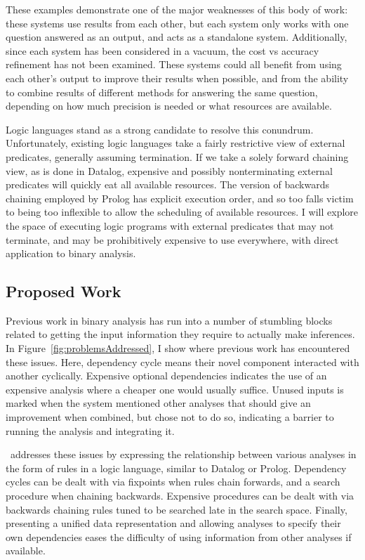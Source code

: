 These examples demonstrate one of the major weaknesses of this body of work: these systems use results from each other, but each system only works with one question answered as an output, and acts as a standalone system.
Additionally, since each system has been considered in a vacuum, the cost vs accuracy refinement has not been examined.
These systems could all benefit from using each other's output to improve their results when possible, and from the ability to combine results of different methods for answering the same question, depending on how much precision is needed or what resources are available.

Logic languages stand as a strong candidate to resolve this conundrum. Unfortunately, existing logic languages take a fairly restrictive view of external predicates, generally assuming termination.
If we take a solely forward chaining view, as is done in Datalog, expensive and possibly nonterminating external predicates will quickly eat all available resources.
The version of backwards chaining employed by Prolog has explicit execution order, and so too falls victim to being too inflexible to allow the scheduling of available resources.
I will explore the space of executing logic programs with external predicates that may not terminate, and may be prohibitively expensive to use everywhere, with direct application to binary analysis.

\subsection{Proposed Work}
Previous work in binary analysis has run into a number of stumbling blocks related to getting the input information they require to actually make inferences. 
In Figure~\ref{fig:problemsAddressed}, I show where previous work has encountered these issues.
Here, dependency cycle means their novel component interacted with another cyclically.
Expensive optional dependencies indicates the use of an expensive analysis where a cheaper one would usually suffice.
Unused inputs is marked when the system mentioned other analyses that should give an improvement when combined, but chose not to do so, indicating a barrier to running the analysis and integrating it.

\sysname\ addresses these issues by expressing the relationship between various analyses in the form of rules in a logic language, similar to Datalog or Prolog.
Dependency cycles can be dealt with via fixpoints when rules chain forwards, and a search procedure when chaining backwards.
Expensive procedures can be dealt with via backwards chaining rules tuned to be searched late in the search space.
Finally, presenting a unified data representation and allowing analyses to specify their own dependencies eases the difficulty of using information from other analyses if available.

